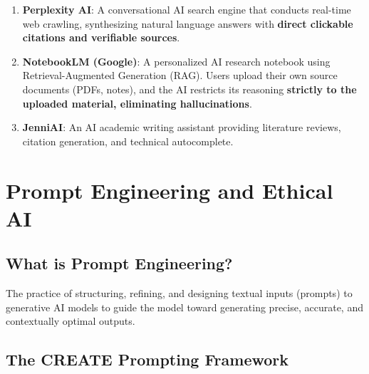 \begin{enumerate}[leftmargin=1.5em]
    \item \textbf{Perplexity AI}: A conversational AI search engine that conducts real-time web crawling, synthesizing natural language answers with \textbf{direct clickable citations and verifiable sources}.
    \item \textbf{NotebookLM (Google)}: A personalized AI research notebook using Retrieval-Augmented Generation (RAG). Users upload their own source documents (PDFs, notes), and the AI restricts its reasoning \textbf{strictly to the uploaded material, eliminating hallucinations}.
    \item \textbf{JenniAI}: An AI academic writing assistant providing literature reviews, citation generation, and technical autocomplete.
\end{enumerate}

\section{Prompt Engineering and Ethical AI}

\subsection{What is Prompt Engineering?}

\begin{definition}
The practice of structuring, refining, and designing textual inputs (prompts) to generative AI models to guide the model toward generating precise, accurate, and contextually optimal outputs.
\end{definition}

\subsection{The CREATE Prompting Framework}

